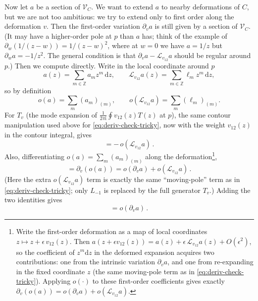 \documentclass[12pt,letterpaper,reqno]{amsart}
\numberwithin{equation}{section}
\newcommand{\cL}{\ensuremath{\mathcal L}}
\newcommand{\bbZ}{\ensuremath{\mathbb Z}}
\newcommand{\I}{{\mathrm i}}
\newcommand{\de}{\mathrm{d}}
\newcommand{\vertex}{\mathcal{V}}
\begin{document}
Now let $a$ be a section of $\vertex_C$. We want to extend $a$ to nearby deformations of $C$, but we
are not too ambitious: we try to extend only to first order along the deformation $v$.
Then the first-order variation $\partial_v a$ is still given by 
a section of $\vertex_C$. (It may have a
higher-order pole at $p$ than $a$ has; think of the example of $\partial_w (1 / (z-w)) = 1/(z-w)^2$,
where at $w = 0$ we have $a = 1/z$ but $\partial_w a = -1/z^2$. The general condition 
is that $\partial_v a - \cL_{v_{12}} a$ should be regular around $p$.) Then we 
compute directly. Write in the local coordinate around $p$
\begin{equation}
  a(z) = \sum_{m \in \bbZ} a_m z^m \, \de z, \qquad
  \cL_{v_{12}} a(z) = \sum_{m \in \bbZ} \ell_m z^m \, \de z,
\end{equation}
so by definition
\begin{equation}
  o(a) = \sum_m (a_m)_{(m)}, \qquad o(\cL_{v_{12}} a) = \sum_m (\ell_m)_{(m)}.
\end{equation}
For $T_v$ (the mode expansion of $\frac{1}{2\pi\I}\oint v_{12}(z)T(z)$ at $p$),
the same contour manipulation used above for \eqref{eq:deriv-check-tricky}, now with the weight
$v_{12}(z)$ in the contour integral, gives
\begin{equation}
  [T_v, o(a)] = - \, o(\cL_{v_{12}} a) \, .
\end{equation}
Also, differentiating $o(a)=\sum_m (a_m)_{(m)}$ along the deformation\footnote{Write the first-order deformation as a map of local coordinates
$z \mapsto z + \epsilon \, v_{12}(z)$.
Then
$a(z+\epsilon v_{12}(z)) = a(z) + \epsilon \, \cL_{v_{12}} a(z) + O(\epsilon^2)$,
so the coefficient of $z^m\de z$ in the deformed expansion acquires two contributions:
one from the intrinsic variation $\partial_v a$, and one from re-expanding in the fixed coordinate $z$
(the same moving-pole term as in \eqref{eq:deriv-check-tricky}).
Applying $o(\cdot)$ to these first-order coefficients gives exactly
$\partial_v(o(a)) = o(\partial_v a) + o(\cL_{v_{12}} a)$.},
\begin{equation}
  [\partial_v, o(a)] = \partial_v(o(a)) = o(\partial_v a) + o(\cL_{v_{12}} a) \, .
\end{equation}
(Here the extra $o(\cL_{v_{12}} a)$ term is exactly the same ``moving-pole'' term as in
\eqref{eq:deriv-check-tricky}; only $L_{-1}$ is replaced by the full generator $T_v$.)
Adding the two identities gives
\begin{equation}
  [\partial_v + T_v, o(a)] = o(\partial_v a) \, .
\end{equation}
\end{document}
